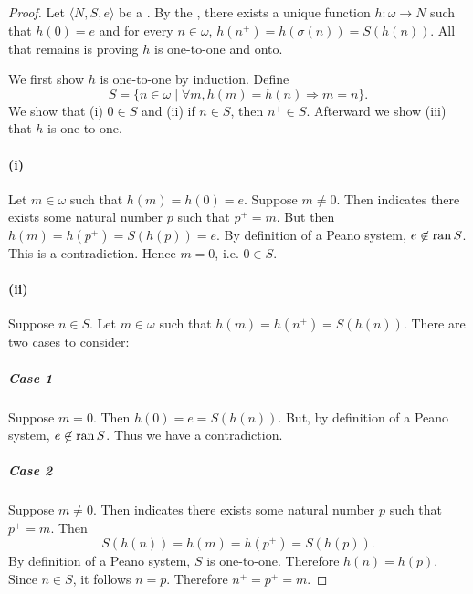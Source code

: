 \documentclass{report}
\begin{document}
  \begin{proof}

    Let $\langle N, S, e \rangle$ be a .
    By the , there exists a
      unique function $h \colon \omega \rightarrow N$ such that $h(0) = e$ and
      for every $n \in \omega$, $h(n^+) = h(\sigma(n)) = S(h(n))$.
    All that remains is proving $h$ is one-to-one and onto.
    \suitdivider

    \noindent
    We first show $h$ is one-to-one by induction.
    Define
      $$S = \{n \in \omega \mid \forall m, h(m) = h(n) \Rightarrow m = n\}.$$
    We show that (i) $0 \in S$ and (ii) if $n \in S$, then $n^+ \in S$.
    Afterward we show (iii) that $h$ is one-to-one.

    \paragraph{(i)}%

      Let $m \in \omega$ such that $h(m) = h(0) = e$.
      Suppose $m \neq 0$.
      Then  indicates there exists some natural number
        $p$ such that $p^+ = m$.
      But then $h(m) = h(p^+) = S(h(p)) = e$.
      By definition of a Peano system, $e \not\in \mathop{\text{ran}}{S}$.
      This is a contradiction.
      Hence $m = 0$, i.e. $0 \in S$.

    \paragraph{(ii)}%

      Suppose $n \in S$.
      Let $m \in \omega$ such that $h(m) = h(n^+) = S(h(n))$.
      There are two cases to consider:

      \subparagraph{Case 1}%

        Suppose $m = 0$.
        Then $h(0) = e = S(h(n))$.
        But, by definition of a Peano system, $e \not\in \mathop{\text{ran}}{S}$.
        Thus we have a contradiction.

      \subparagraph{Case 2}%

        Suppose $m \neq 0$.
        Then  indicates there exists some natural number
          $p$ such that $p^+ = m$.
        Then $$S(h(n)) = h(m) = h(p^+) = S(h(p)).$$
        By definition of a Peano system, $S$ is one-to-one.
        Therefore $h(n) = h(p)$.
        Since $n \in S$, it follows $n = p$.
        Therefore $n^+ = p^+ = m$.


\end{proof}
\end{document}

